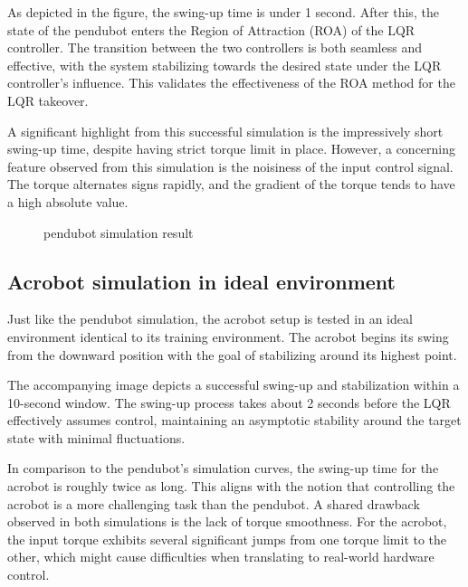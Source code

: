 As depicted in the figure, the swing-up time is under 1 second. After this, the state of the pendubot enters the Region of Attraction (ROA) of the LQR controller. The transition between the two controllers is both seamless and effective, with the system stabilizing towards the desired state under the LQR controller's influence. This validates the effectiveness of the ROA method for the LQR takeover.

A significant highlight from this successful simulation is the impressively short swing-up time, despite having strict torque limit in place. However, a concerning feature observed from this simulation is the noisiness of the input control signal. The torque alternates signs rapidly, and the gradient of the torque tends to have a high absolute value.

\begin{figure}[H]
    \centering
    \caption{pendubot simulation result}
    \label{fig:image_a}
\end{figure}

\subsection{Acrobot simulation in ideal environment}

Just like the pendubot simulation, the acrobot setup is tested in an ideal environment identical to its training environment. The acrobot begins its swing from the downward position with the goal of stabilizing around its highest point.

The accompanying image depicts a successful swing-up and stabilization within a 10-second window. The swing-up process takes about 2 seconds before the LQR effectively assumes control, maintaining an asymptotic stability around the target state with minimal fluctuations.

In comparison to the pendubot's simulation curves, the swing-up time for the acrobot is roughly twice as long. This aligns with the notion that controlling the acrobot is a more challenging task than the pendubot. A shared drawback observed in both simulations is the lack of torque smoothness. For the acrobot, the input torque exhibits several significant jumps from one torque limit to the other, which might cause difficulties when translating to real-world hardware control.

